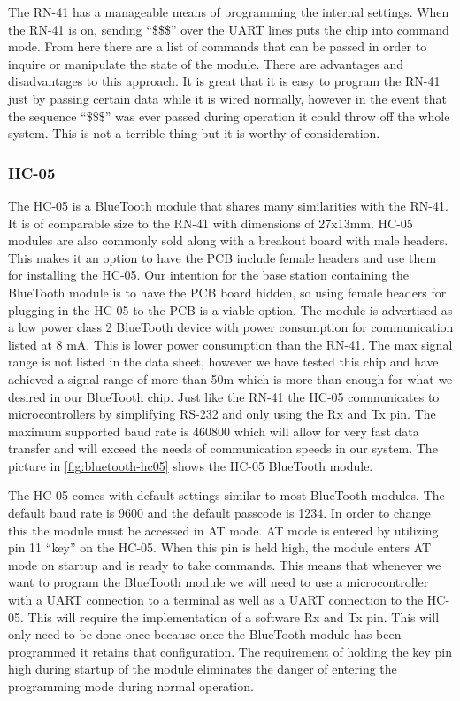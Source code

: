 
The RN{}-41 has a manageable means of programming the internal settings. When
the RN{}-41 is on, sending {}``\$\$\$'' over the UART lines puts the chip into
command mode. From here there are a list of commands that can be passed in
order to inquire or manipulate the state of the module. There are advantages
and disadvantages to this approach. It is great that it is easy to program the
RN{}-41 just by passing certain data while it is wired normally, however in the
event that the sequence {}``\$\$\$'' was ever passed during operation it could
throw off the whole system. This is not a terrible thing but it is worthy of
consideration.

\subsubsection{HC-05}
The HC{}-05 is a BlueTooth module that shares many similarities with the
RN{}-41. It is of comparable size to the RN{}-41 with dimensions of 27x13mm.
HC{}-05 modules are also commonly sold along with a breakout board with male
headers. This makes it an option to have the PCB include female headers and use
them for installing the HC{}-05. Our intention for the base station containing
the BlueTooth module is to have the PCB board hidden, so using female headers
for plugging in the HC{}-05 to the PCB is a viable option. The module is
advertised as a low power class 2 BlueTooth device with power consumption for
communication listed at 8 mA. This is lower power consumption than the RN{}-41.
The max signal range is not listed in the data sheet, however we have tested
this chip and have achieved a signal range of more than 50m which is more than
enough for what we desired in our BlueTooth chip. Just like the RN{}-41 the
HC{}-05 communicates to microcontrollers by simplifying RS{}-232 and only using
the Rx and Tx pin. The maximum supported baud rate is 460800 which will allow
for very fast data transfer and will exceed the needs of communication speeds
in our system. The picture in \autoref{fig:bluetooth-hc05} shows the HC{}-05
BlueTooth module.


The HC{}-05 comes with default settings similar to most BlueTooth modules. The
default baud rate is 9600 and the default passcode is 1234. In order to change
this the module must be accessed in AT mode. AT mode is entered by utilizing
pin 11 {}``key{}'' on the HC{}-05. When this pin is held high, the module
enters AT mode on startup and is ready to take commands. This means that
whenever we want to program the BlueTooth module we will need to use a
microcontroller with a UART connection to a terminal as well as a UART
connection to the HC{}-05. This will require the implementation of a software
Rx and Tx pin. This will only need to be done once because once the BlueTooth
module has been programmed it retains that configuration. The requirement of
holding the key pin high during startup of the module eliminates the danger of
entering the programming mode during normal operation.

